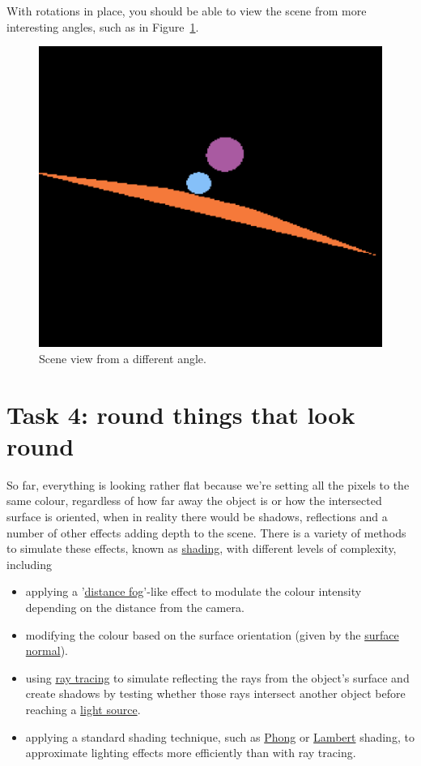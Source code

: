 \documentclass{../../../fal_assignment}
\begin{document}
With rotations in place, you should be able to view the scene from more interesting angles, such as in Figure~\ref{fig:rotate}.

\begin{figure}[ht]
	\begin{center}
		\includegraphics[width=0.25\linewidth]{rotate}
	\end{center}
	\caption{Scene view from a different angle.}
	\label{fig:rotate}
\end{figure}

\section*{Task 4: round things that look round}

So far, everything is looking rather flat because we're setting all the pixels to the same colour, regardless of how far away the object is or how the intersected surface is oriented, when in reality there would be shadows, reflections and a number of other effects adding depth to the scene. There is a variety of methods to simulate these effects, known as \href{https://www.scratchapixel.com/lessons/3d-basic-rendering/introduction-to-shading}{shading}, with different levels of complexity, including
\begin{itemize}
	\item applying a '\href{https://en.wikipedia.org/wiki/Distance_fog}{distance fog}'-like effect to modulate the colour intensity depending on the distance from the camera.
	\item modifying the colour based on the surface orientation (given by the \href{https://mathworld.wolfram.com/NormalVector.html}{surface normal}).
	\item using \href{https://www.scratchapixel.com/lessons/3d-basic-rendering/introduction-to-ray-tracing}{ray tracing} to simulate reflecting the rays from the object's surface and create shadows by testing whether those rays intersect another object before reaching a \href{https://www.scratchapixel.com/lessons/3d-basic-rendering/introduction-to-shading/shading-lights}{light source}.
	\item applying a standard shading technique, such as \href{https://www.scratchapixel.com/lessons/3d-basic-rendering/phong-shader-BRDF}{Phong} or \href{https://www.scratchapixel.com/lessons/3d-basic-rendering/introduction-to-shading/diffuse-lambertian-shading}{Lambert} shading, to approximate lighting effects more efficiently than with ray tracing.
\end{itemize}
\end{document}
